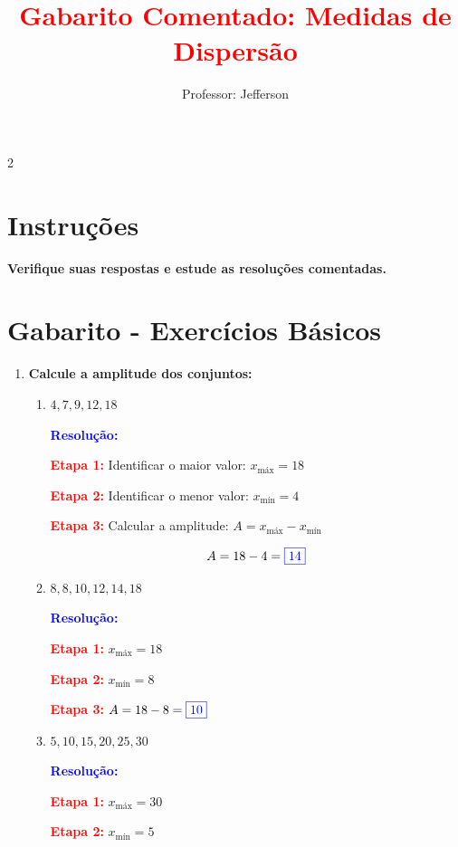 \documentclass[11pt]{article}
\title{\textcolor{red}{Gabarito Comentado: Medidas de Dispersão}}
\author{Professor: Jefferson}
\date{}
\newcommand{\respostaNum}[1]{\textcolor{blue}{\boxed{#1}}}
\newcommand{\resolucao}{\textbf{\textcolor{blue}{Resolução:}}}
\begin{document}
\maketitle
\vspace{-1cm}

\begin{multicols}{2}

\section*{Instruções}
\textbf{Verifique suas respostas e estude as resoluções comentadas.}

\section*{Gabarito - Exercícios Básicos}

\begin{enumerate}[leftmargin=*]

\item \textbf{Calcule a amplitude dos conjuntos:}

\begin{enumerate}[label=\alph*)]
\item $4, 7, 9, 12, 18$

\resolucao

\textbf{\textcolor{red}{Etapa 1:}} Identificar o maior valor: $x_{\text{máx}} = 18$

\textbf{\textcolor{red}{Etapa 2:}} Identificar o menor valor: $x_{\text{mín}} = 4$

\textbf{\textcolor{red}{Etapa 3:}} Calcular a amplitude: $A = x_{\text{máx}} - x_{\text{mín}}$

\[
A = 18 - 4 = \respostaNum{14}
\]

\item $8, 8, 10, 12, 14, 18$

\resolucao

\textbf{\textcolor{red}{Etapa 1:}} $x_{\text{máx}} = 18$

\textbf{\textcolor{red}{Etapa 2:}} $x_{\text{mín}} = 8$

\textbf{\textcolor{red}{Etapa 3:}} $A = 18 - 8 = \respostaNum{10}$

\item $5, 10, 15, 20, 25, 30$

\resolucao

\textbf{\textcolor{red}{Etapa 1:}} $x_{\text{máx}} = 30$

\textbf{\textcolor{red}{Etapa 2:}} $x_{\text{mín}} = 5$


\end{enumerate}
\end{enumerate}
\end{multicols}
\end{document}
